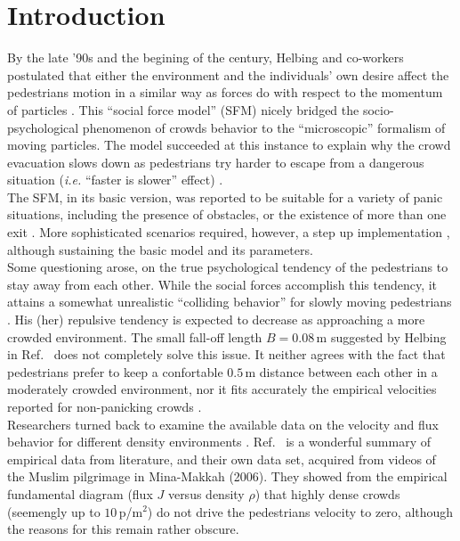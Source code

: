 \section{\label{introduction}Introduction}

By the late '90s and the begining of the century, Helbing and co-workers 
postulated that either the environment and the individuals' own desire affect 
the pedestrians motion in a similar way as forces do with respect to the 
momentum of particles \cite{Helbing1,Helbing4}. This ``social force model'' 
(SFM) nicely bridged the socio-psychological phenomenon of crowds 
behavior to the ``microscopic'' formalism of moving particles. The model 
succeeded at this instance to explain why the crowd evacuation slows down 
as pedestrians try harder to escape from a dangerous situation 
(\textit{i.e.} ``faster is slower'' effect) \cite{Helbing1,Dorso1,Dorso2}. 
  \\ 

The SFM, in its basic version, was reported to be suitable for a variety of 
panic situations, including the presence of obstacles, or the existence of more 
than one exit \cite{Dorso3,Dorso5}. More sophisticated scenarios required, 
however, a step up implementation \cite{Dorso4,Dorso6,Cornes1}, although 
sustaining the basic model and its parameters.  \\

Some questioning arose, on the true psychological tendency of the pedestrians to 
stay away from each other. While the social forces accomplish this tendency, it 
attains a somewhat unrealistic ``colliding behavior'' for slowly moving 
pedestrians \cite{Lakoba}. His (her) repulsive tendency is expected to decrease 
as approaching a more crowded environment. The small fall-off length $B=0.08\,$m 
suggested by Helbing in Ref.~\cite{Helbing1} does not completely solve this 
issue. It neither agrees with the fact that pedestrians prefer to keep a 
confortable $0.5\,$m distance between each other in a moderately crowded 
environment, nor it fits accurately the empirical velocities reported for 
non-panicking crowds \cite{Lakoba}.  \\

Researchers turned back to examine the available data on the velocity and flux 
behavior for different density environments \cite{helbing3,seyfried1}. 
Ref.~\cite{helbing3} is a wonderful summary of empirical data from literature, 
and their own data set, acquired from videos of the Muslim pilgrimage in 
Mina-Makkah (2006). They showed from the empirical fundamental diagram (flux $J$ 
versus density $\rho$) that highly dense crowds (seemengly up to $10\,$p/m$^2$) 
do not drive the pedestrians velocity to zero, although the reasons for this 
remain rather obscure.   \\

